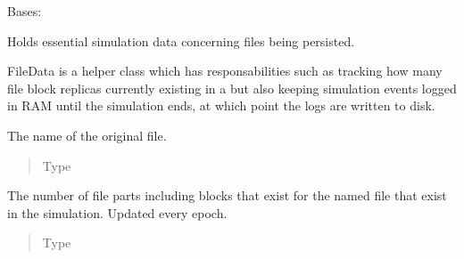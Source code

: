 \documentclass[letterpaper,10pt,english]{sphinxmanual}
\begin{document}

\begin{fulllineitems}
\label{\detokenize{app.domain.helpers:app.domain.helpers.smart_dataclasses.FileData}}
Bases: 

Holds essential simulation data concerning files being persisted.

FileData is a helper class which has responsabilities such as tracking
how many file block replicas currently existing in a
{\hyperref[\detokenize{app.domain:app.domain.cluster_groups.Cluster}]{}}
but also keeping simulation events logged in RAM until the simulation
ends, at which point the logs are written to disk.

\begin{fulllineitems}
\label{\detokenize{app.domain.helpers:app.domain.helpers.smart_dataclasses.FileData.name}}
The name of the original file.
\begin{quote}\begin{description}
\item[{Type}] \leavevmode
{}

\end{description}\end{quote}

\end{fulllineitems}


\begin{fulllineitems}
\label{\detokenize{app.domain.helpers:app.domain.helpers.smart_dataclasses.FileData.existing_replicas}}
The number of file parts including blocks that exist for the
named file that exist in the simulation. Updated every epoch.
\begin{quote}\begin{description}
\item[{Type}] \leavevmode
{}


\end{description}
\end{quote}
\end{fulllineitems}
\end{fulllineitems}
\end{document}
